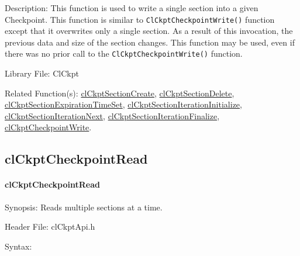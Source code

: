 \begin{flushleft}
\begin{Desc}
\begin{description}
\end{description}
\end{Desc}
\begin{Desc}
\item[Description:]This function is used to write a single section into a given Checkpoint. This function is similar to {\tt{ClCkptCheckpointWrite()}} 
function except that it overwrites only a single section. As a result of this invocation, the previous data and size of the section changes. This function may
be used, even if there was no prior call to the {\tt{ClCkptCheckpointWrite()}} function.\end{Desc}
\begin{Desc}
\item[Library File:]Cl\-Ckpt\end{Desc}
\begin{Desc}
\item[Related Function(s):]\hyperlink{pageckpt110}{cl\-Ckpt\-Section\-Create}, \hyperlink{pageckpt111}{cl\-Ckpt\-Section\-Delete}, 
\hyperlink{pageckpt112}{cl\-Ckpt\-Section\-Expiration\-Time\-Set}, \hyperlink{pageckpt113}{cl\-Ckpt\-Section\-Iteration\-Initialize}, 
\hyperlink{pageckpt114}{cl\-Ckpt\-Section\-Iteration\-Next}, \hyperlink{pageckpt115}{cl\-Ckpt\-Section\-Iteration\-Finalize}, 
\hyperlink{pageckpt116}{cl\-Ckpt\-Checkpoint\-Write}. \end{Desc}
\newpage


\subsection{clCkptCheckpointRead}
\hypertarget{pageckpt118}{}\paragraph{cl\-Ckpt\-Checkpoint\-Read}\label{pageckpt118}
\begin{Desc}
\item[Synopsis:]Reads multiple sections at a time.\end{Desc}
\begin{Desc}
\item[Header File:]clCkptApi.h\end{Desc}
\begin{Desc}
\item[Syntax:]


\end{Desc}
\end{flushleft}

